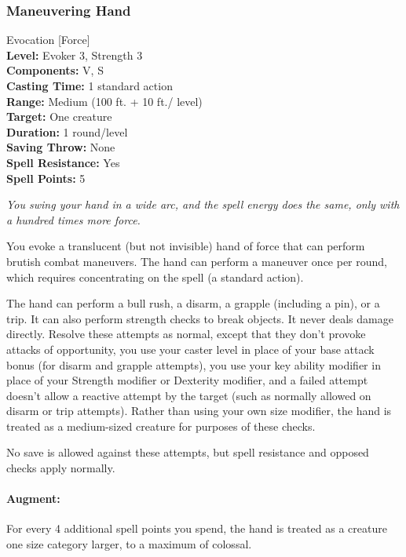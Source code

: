 \subsubsection{Maneuvering Hand}
\label{Spell:ManeuveringHand}
Evocation [Force]
\\ \textbf{Level:} Evoker 3, Strength 3
\\ \textbf{Components:} V, S
\\ \textbf{Casting Time:} 1 standard action
\\ \textbf{Range:} Medium (100 ft. + 10 ft./ level)
\\ \textbf{Target:} One creature
\\ \textbf{Duration:} 1 round/level
\\ \textbf{Saving Throw:} None
\\ \textbf{Spell Resistance:} Yes
\\ \textbf{Spell Points:} 5

\emph{You swing your hand in a wide arc, and the spell energy does the same, only with a hundred times more force.}

You evoke a translucent (but not invisible) hand of force that can perform brutish combat maneuvers.
The hand can perform a maneuver once per round, which requires concentrating on the spell (a standard action). 

The hand can perform a bull rush, a disarm, a grapple (including a pin), or a trip. It can also perform strength checks to break objects. It never deals damage directly.
Resolve these attempts as normal, except that they don't provoke attacks of opportunity,
you use your caster level in place of your base attack bonus (for disarm and grapple attempts), you use your key ability modifier in place of your Strength modifier or Dexterity modifier, and a failed attempt doesn't allow a reactive attempt by the target (such as normally allowed on disarm or trip attempts).
Rather than using your own size modifier, the hand is treated as a medium-sized creature for purposes of these checks.

No save is allowed against these attempts, but spell resistance and opposed checks apply normally.

\paragraph{Augment:}
For every 4 additional spell points you spend, the hand is treated as a creature one size category larger, to a maximum of colossal.

